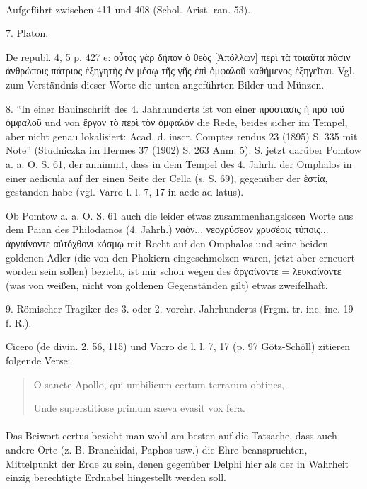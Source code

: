 \documentclass[a4paper, 11pt, oneside]{article}
\begin{document}
\paragraph{}
Aufgeführt zwischen 411 und 408 (Schol. Arist. ran. 53).

7. Platon.

De republ. 4, 5 p. 427 e: οὗτος γὰρ δήπον ὁ θεὸς [Ἀπόλλων] περὶ τὰ τοιαῦτα πᾶσιν ἀνθρώποις πάτριος ἐξηγητὴς ἐν μέσῳ τῆς γῆς ἐπὶ ὀμφαλοῦ καθήμενος ἐξηγεῖται. Vgl. zum Verständnis dieser Worte die unten angeführten Bilder und Münzen.

8. "`In einer Bauinschrift des 4. Jahrhunderts ist von einer πρόστασις ἡ πρὸ τοῦ ὀμφαλοῦ und von ἔργον τὸ περὶ τὸν ὀμφαλόν die Rede, beides sicher im Tempel, aber nicht genau lokalisiert: Acad. d. inscr. Comptes rendus 23 (1895) S. 335 mit Note"' (Studniczka im Hermes 37 (1902) S. 263 Anm. 5). S. jetzt darüber Pomtow a. a. O. S. 61, der annimmt, dass in dem Tempel des 4. Jahrh. der Omphalos in einer aedicula auf der einen Seite der Cella (s. S. 69), gegenüber der ἑστία, gestanden habe (vgl. Varro l. l. 7, 17 in aede ad latus).

Ob Pomtow a. a. O. S. 61 auch die leider etwas zusammenhangslosen Worte aus dem Paian des Philodamos (4. Jahrh.) ναὸν... νεοχρύσεον χρυσέοις τύποις... ἀργαίνοντε αὐτόχθονι κόσμῳ mit Recht auf den Omphalos und seine beiden goldenen Adler (die von den Phokiern eingeschmolzen waren, jetzt aber erneuert worden sein sollen) bezieht, ist mir schon wegen des ἀργαίνοντε = λευκαίνοντε (was von weißen, nicht von goldenen Gegenständen gilt) etwas zweifelhaft.

9. Römischer Tragiker des 3. oder 2. vorchr. Jahrhunderts (Frgm. tr. inc. inc. 19 f. R.).

Cicero (de divin. 2, 56, 115) und Varro de l. l. 7, 17 (p. 97 Götz-Schöll) zitieren folgende Verse:
\begin{quotation}
O sancte Apollo, qui umbilicum certum terrarum obtines,

Unde superstitiose primum saeva evasit vox fera.
\end{quotation}
\paragraph{}
Das Beiwort certus bezieht man wohl am besten auf die Tatsache, dass auch andere Orte (z. B. Branchidai, Paphos usw.) die Ehre beanspruchten, Mittelpunkt der Erde zu sein, denen gegenüber Delphi hier als der in Wahrheit einzig berechtigte Erdnabel hingestellt werden soll.
\end{document}
